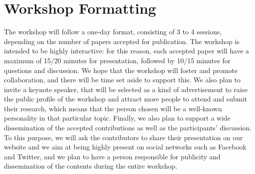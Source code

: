 \section{Workshop Formatting}
\label{sec:format}
The workshop will follow a one-day format, consisting of 3 to 4 sessions, depending on the number of papers accepted for publication. The workshop is intended to be highly interactive: for this reason, each accepted paper will have a maximum of 15/20 minutes for presentation, followed by 10/15 minutes for questions and discussion. We hope that the workshop will foster and promote collaboration, and there will be time set aside to support this.
We also plan to invite a keynote speaker, that will be selected as a kind of advertisement to raise the public profile of the workshop and attract more people to attend and submit their research, which means that the person chosen will be a well-known personality in that particular topic.
Finally, we also plan to support a wide dissemination of the accepted contributions as well as the participants’ discussion. To this purpose, we will ask the contributors to share their presentation on our website and we aim at being highly present on social networks such as Facebook and Twitter, and we plan to have a person responsible for publicity and dissemination of the contents during the entire workshop.
